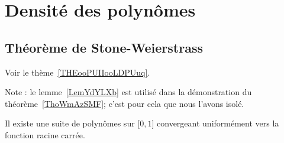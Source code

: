\section{Densité des polynômes}

\subsection{Théorème de Stone-Weierstrass}

Voir le thème~\ref{THEooPUIIooLDPUuq}.

Note : le lemme~\ref{LemYdYLXb} est utilisé dans la démonstration du théorème~\ref{ThoWmAzSMF}; c'est pour cela que nous l'avons isolé.

\begin{lemma}       \label{LemYdYLXb}
	Il existe une suite de polynômes sur \( \mathopen[ 0 , 1 \mathclose]\) convergeant uniformément vers la fonction racine carrée.
\end{lemma}

